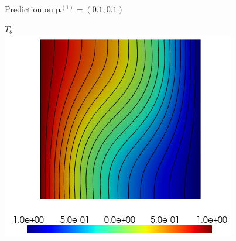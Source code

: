 \begin{frame}{Prediction on $\bm{\mu}^{(1)} = (0.1,0.1)$}
\begin{minipage}{0.26\linewidth}
    \end{minipage} \; \begin{minipage}{0.26\linewidth}
        \centering
        $T_\theta$ \\
        \includegraphics[width=0.95\linewidth]{images/pinn/training/PINN_plot_case4_v2_param1_T.png}
    \end{minipage}

    \vspace{8pt}


\end{frame}
